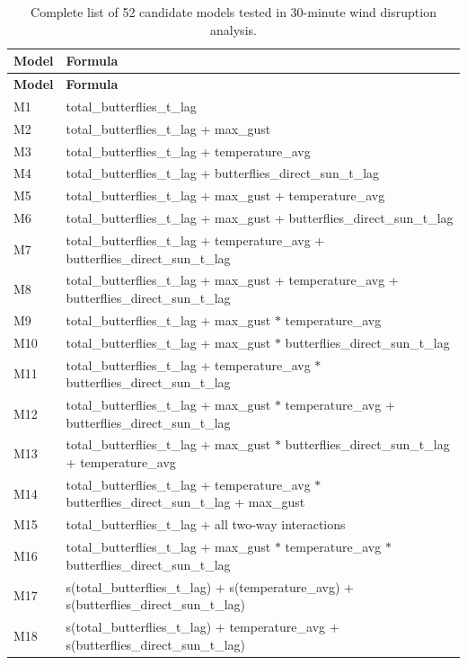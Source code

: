 \documentclass[insects,article,submit,pdftex,moreauthors]{Definitions/mdpi}
\begin{document}
\begin{appendix}
\begin{longtable}{ll}
\caption{Complete list of 52 candidate models tested in 30-minute wind disruption analysis.} \label{tab:30min_candidates} \\
\toprule
\textbf{Model} & \textbf{Formula} \\
\midrule
\endfirsthead
\toprule
\textbf{Model} & \textbf{Formula} \\
\midrule
\endhead
M1  & total\_butterflies\_t\_lag \\
M2  & total\_butterflies\_t\_lag + max\_gust \\
M3  & total\_butterflies\_t\_lag + temperature\_avg \\
M4  & total\_butterflies\_t\_lag + butterflies\_direct\_sun\_t\_lag \\
M5  & total\_butterflies\_t\_lag + max\_gust + temperature\_avg \\
M6  & total\_butterflies\_t\_lag + max\_gust + butterflies\_direct\_sun\_t\_lag \\
M7  & total\_butterflies\_t\_lag + temperature\_avg + butterflies\_direct\_sun\_t\_lag \\
M8  & total\_butterflies\_t\_lag + max\_gust + temperature\_avg + butterflies\_direct\_sun\_t\_lag \\
M9  & total\_butterflies\_t\_lag + max\_gust $*$ temperature\_avg \\
M10 & total\_butterflies\_t\_lag + max\_gust $*$ butterflies\_direct\_sun\_t\_lag \\
M11 & total\_butterflies\_t\_lag + temperature\_avg $*$ butterflies\_direct\_sun\_t\_lag \\
M12 & total\_butterflies\_t\_lag + max\_gust $*$ temperature\_avg + butterflies\_direct\_sun\_t\_lag \\
M13 & total\_butterflies\_t\_lag + max\_gust $*$ butterflies\_direct\_sun\_t\_lag + temperature\_avg \\
M14 & total\_butterflies\_t\_lag + temperature\_avg $*$ butterflies\_direct\_sun\_t\_lag + max\_gust \\
M15 & total\_butterflies\_t\_lag + all two-way interactions \\
M16 & total\_butterflies\_t\_lag + max\_gust $*$ temperature\_avg $*$ butterflies\_direct\_sun\_t\_lag \\
M17 & s(total\_butterflies\_t\_lag) + s(temperature\_avg) + s(butterflies\_direct\_sun\_t\_lag) \\
M18 & s(total\_butterflies\_t\_lag) + temperature\_avg + s(butterflies\_direct\_sun\_t\_lag) \\

\end{longtable}
\end{appendix}
\end{document}
